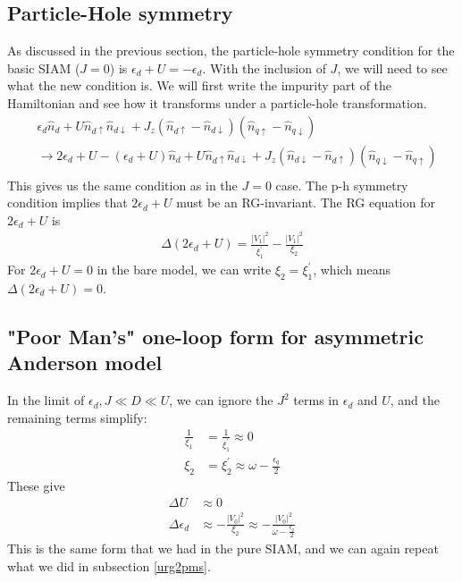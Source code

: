 \documentclass[twoside,11pt]{report}
\numberwithin{equation}{section}
\begin{document}
\subsection{Particle-Hole symmetry}
As discussed in the previous section, the particle-hole symmetry condition for the basic SIAM (\(J=0\)) is \(\epsilon_d + U = -\epsilon_d\). With the inclusion of \(J\), we will need to see what the new condition is. We will first write the impurity part of the Hamiltonian and see how it transforms under a particle-hole transformation.
\begin{equation}\begin{aligned}
	&\epsilon_d \hat n_d + U \hat n_{d\uparrow}\hat n_{d\downarrow} + J_z \left(\hat n_{d\uparrow} - \hat n_{d\downarrow}\right)\left(\hat n_{q\uparrow} - \hat n_{q\downarrow}\right)\\
&	\rightarrow 2\epsilon_d + U  -\left(\epsilon_d + U\right)\hat n_d + U \hat n_{d\uparrow}\hat n_{d\downarrow} + J_z \left(\hat n_{d\downarrow} - \hat n_{d\uparrow}\right)\left(\hat n_{q\downarrow} - \hat n_{q\uparrow}\right)\\
\end{aligned}\end{equation}
This gives us the same condition as in the \(J=0\) case. The p-h symmetry condition implies that \(2\epsilon_d + U\) must be an RG-invariant. The RG equation for \(2\epsilon_d + U\) is
\begin{equation}\begin{aligned}
	\Delta \left(2\epsilon_d + U\right) = \frac{|V_1|^2}{\xi_1^\prime} - \frac{|V_1|^2}{\xi_2}
\end{aligned}\end{equation}
For \(2\epsilon_d + U=0\) in the bare model, we can write \(\xi_2 = \xi_1^\prime\), which means \(\Delta \left(2\epsilon_d + U\right) = 0\).
\subsection{"Poor Man's" one-loop form for asymmetric Anderson model}
In the limit of \(\epsilon_d, J \ll D \ll U \), we can ignore the \(J^2\) terms in \(\epsilon_d\) and \(U\), and the remaining terms simplify:
\begin{equation}\begin{aligned}
	\frac{1}{\xi_1} &= \frac{1}{\xi_1^\prime} \approx 0\\
	\xi_2 &= \xi_2^\prime \approx \omega - \frac{\epsilon_q}{2}
\end{aligned}\end{equation}
These give
\begin{equation}\begin{aligned}
	\Delta U &\approx 0 \\
	\Delta \epsilon_d &\approx - \frac{|V_0|^2}{\xi_2} \approx -\frac{|V_0|^2}{\omega - \frac{\epsilon_q}{2}}
\end{aligned}\end{equation}
This is the same form that we had in the pure SIAM, and we can again repeat what we did in subsection \ref{urg2pms}.
\end{document}
